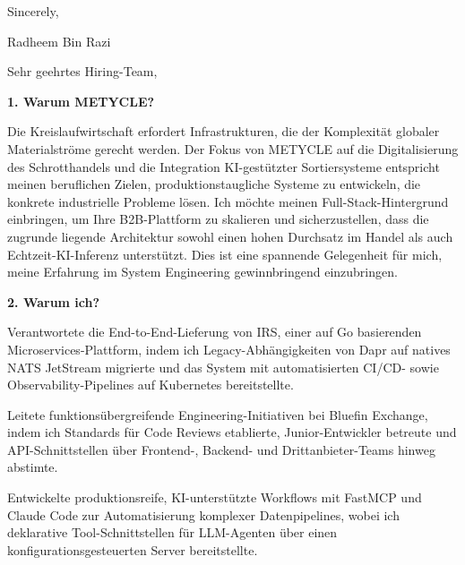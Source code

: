 \documentclass[11pt,a4paper]{coverletter}
\begin{document}
\closing{Sincerely,}{Radheem Bin Razi}

\clearpage
{}


\opening{Sehr geehrtes Hiring-Team,}

\vspace{8pt}\noindent\textbf{1. Warum METYCLE?}\par\vspace{3pt}

Die Kreislaufwirtschaft erfordert Infrastrukturen, die der Komplexität globaler Materialströme gerecht werden. Der Fokus von METYCLE auf die Digitalisierung des Schrotthandels und die Integration KI-gestützter Sortiersysteme entspricht meinen beruflichen Zielen, produktionstaugliche Systeme zu entwickeln, die konkrete industrielle Probleme lösen. Ich möchte meinen Full-Stack-Hintergrund einbringen, um Ihre B2B-Plattform zu skalieren und sicherzustellen, dass die zugrunde liegende Architektur sowohl einen hohen Durchsatz im Handel als auch Echtzeit-KI-Inferenz unterstützt. Dies ist eine spannende Gelegenheit für mich, meine Erfahrung im System Engineering gewinnbringend einzubringen.

\vspace{8pt}\noindent\textbf{2. Warum ich?}\par\vspace{3pt}

\bullets

  \item Verantwortete die End-to-End-Lieferung von IRS, einer auf Go basierenden Microservices-Plattform, indem ich Legacy-Abhängigkeiten von Dapr auf natives NATS JetStream migrierte und das System mit automatisierten CI/CD- sowie Observability-Pipelines auf Kubernetes bereitstellte.

  \item Leitete funktionsübergreifende Engineering-Initiativen bei Bluefin Exchange, indem ich Standards für Code Reviews etablierte, Junior-Entwickler betreute und API-Schnittstellen über Frontend-, Backend- und Drittanbieter-Teams hinweg abstimte.

  \item Entwickelte produktionsreife, KI-unterstützte Workflows mit FastMCP und Claude Code zur Automatisierung komplexer Datenpipelines, wobei ich deklarative Tool-Schnittstellen für LLM-Agenten über einen konfigurationsgesteuerten Server bereitstellte.
\end{document}
